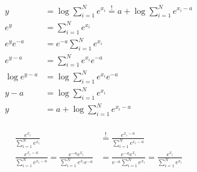 

\newcommand{\ExerciseNumber}{09}

\newcommand{\PersonOne}{Marcel Bruckner (03674122)}
\newcommand{\PersonTwo}{Julian Hohenadel (03673879)}
\newcommand{\PersonThree}{Kevin Bein (03707775)}






%
%
%
\begin{flushleft}
\begin{align*}
y &= \log \sum_{i=1}^{N}e^{x_i} \stackrel{!}{=} a + \log \sum_{i=1}^{N}e^{x_i-a}\\
e^y &= \sum_{i=1}^{N}e^{x_i}\\
e^y e^{-a} &= e^{-a} \sum_{i=1}^{N}e^{x_i}\\
e^{y-a} &= \sum_{i=1}^{N}e^{x_i} e^{-a} \\
\log e^{y-a} &= \log \sum_{i=1}^{N}e^{x_i} e^{-a}\\
y-a &= \log \sum_{i=1}^{N}e^{x_i}\\
y &= a + \log \sum_{i=1}^{N}e^{x_i - a}\\
\end{align*}
\end{flushleft}
%
%
%
\begin{flushleft}
\begin{align*}
\frac{e^{x_i}}{\sum^{N}_{i=1} e^{x_i}} &\stackrel{!}{=} 
\frac{e^{x_{i}-a}}{\sum^{N}_{i=1} e^{x_i - a}}\\
\frac{e^{x_{i}-a}}{\sum^{N}_{i=1} e^{x_i - a}} = 
\frac{e^{-a}e^{x_{i}}}{\sum^{N}_{i=1} e^{x_i} e^{-a}} &=
\frac{e^{-a}e^{x_{i}}}{e^{-a} \sum^{N}_{i=1} e^{x_i}} =
\frac{e^{x_i}}{\sum^{N}_{i=1} e^{x_i}}\\
\end{align*}
\end{flushleft}
%
%
%
%
%





